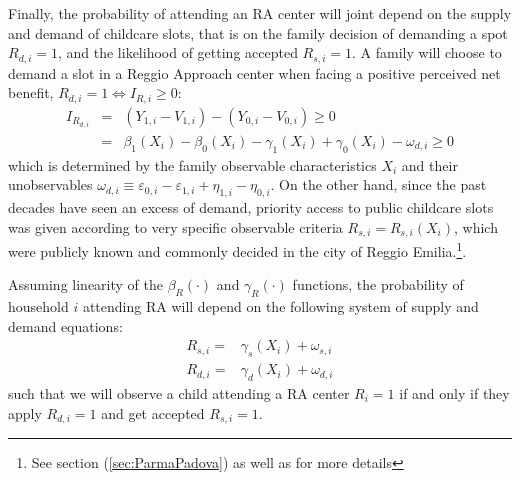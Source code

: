 \documentclass[12pt]{article}
\begin{document}
Finally, the probability of attending an RA center will joint depend on the supply and demand of childcare slots, that is on the family decision of demanding a spot $R_{d,i}=1$, and the likelihood of getting accepted $R_{s,i}=1$. 
A family will choose to demand a slot in a Reggio Approach center when facing a positive perceived net benefit, $R_{d,i}=1 \Leftrightarrow I_{R,i} \geq 0$:
\begin{eqnarray*}
I_{R_{d,i}} &=&\left(Y_{1,i}-V_{1,i}\right)-\left(Y_{0,i}-V_{0,i}\right) \geq 0 \\
&=&\beta_{1}(X_{i})-\beta_{0}(X_{i})-\gamma_{1}(X_{i})+\gamma_{0}(X_{i})-\omega_{d,i} \geq 0 
\end{eqnarray*}%
which is determined by the family observable characteristics $X_{i}$ and their unobservables $\omega_{d,i} \equiv \varepsilon_{0,i}-\varepsilon_{1,i}+\eta_{1,i}-\eta_{0,i}$. %
On the other hand, since the past decades have seen an excess of demand, priority access to public childcare slots was given according to very specific observable criteria $R_{s,i}=R_{s,i}(X_{i})$, which were publicly known and commonly decided in the city of Reggio Emilia.\footnote{See section (\ref{sec:ParmaPadova}) as well as \cite{Brilli2016} for more details}. %

Assuming linearity of the $\beta_{R}(\cdot)$ and $\gamma_{R}(\cdot)$ functions, the probability of household $i$ attending RA will depend on the following system of supply and demand equations:
%
\begin{align}
R_{s,i} = & \gamma_{s} \left(X_{i} \right) + \omega_{s,i}  \label{eq:1stage-supply} \\
R_{d,i} = & \gamma_{d} \left(X_{i} \right) + \omega_{d,i}  \label{eq:1stage-demand} 
%
\end{align}
%
such that we will observe a child attending a RA center $R_{i}=1$ if and only if they apply $R_{d,i}=1$ and get accepted $R_{s,i}=1$.
\end{document}
